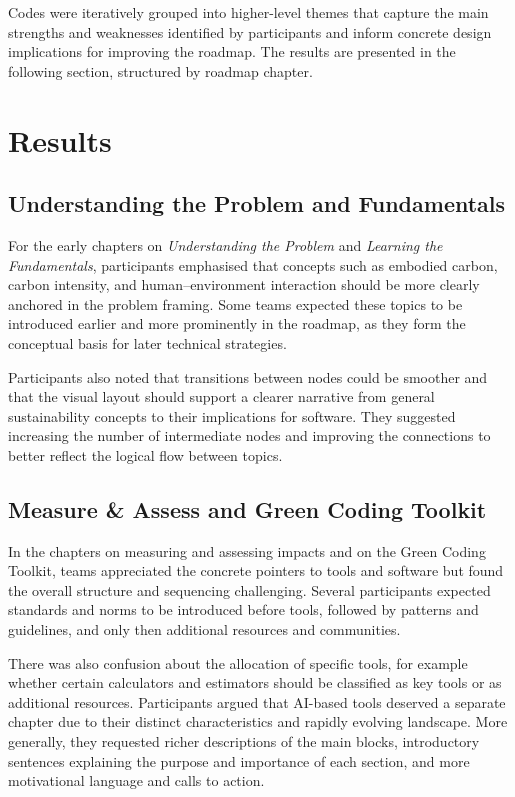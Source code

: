 \documentclass[english]{lni}
\begin{document}
Codes were iteratively grouped into higher-level themes that capture the main strengths and weaknesses identified by participants and inform concrete design implications for improving the roadmap. The results are presented in the following section, structured by roadmap chapter.

\section{Results}
\subsection{Understanding the Problem and Fundamentals}
For the early chapters on \emph{Understanding the Problem} and \emph{Learning the Fundamentals}, participants emphasised that concepts such as embodied carbon, carbon intensity, and human–environment interaction should be more clearly anchored in the problem framing. Some teams expected these topics to be introduced earlier and more prominently in the roadmap, as they form the conceptual basis for later technical strategies.

Participants also noted that transitions between nodes could be smoother and that the visual layout should support a clearer narrative from general sustainability concepts to their implications for software. They suggested increasing the number of intermediate nodes and improving the connections to better reflect the logical flow between topics.

\subsection{Measure \& Assess and Green Coding Toolkit}
In the chapters on measuring and assessing impacts and on the Green Coding Toolkit, teams appreciated the concrete pointers to tools and software but found the overall structure and sequencing challenging. Several participants expected standards and norms to be introduced before tools, followed by patterns and guidelines, and only then additional resources and communities.

There was also confusion about the allocation of specific tools, for example whether certain calculators and estimators should be classified as key tools or as additional resources. Participants argued that AI-based tools deserved a separate chapter due to their distinct characteristics and rapidly evolving landscape. More generally, they requested richer descriptions of the main blocks, introductory sentences explaining the purpose and importance of each section, and more motivational language and calls to action.
\end{document}
